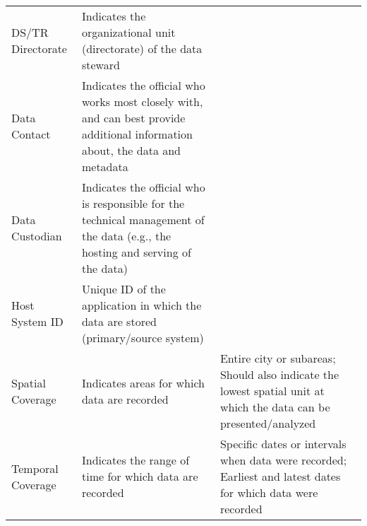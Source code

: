 \begin{table}
\begin{tabular}[t]{lll}
DS/TR Directorate & Indicates the organizational unit (directorate) of the data steward & \\
Data Contact & Indicates the official who works most closely with, and can best provide additional information about, the data and metadata & \\
Data Custodian & Indicates the official who is responsible for the technical management of the data (e.g., the hosting and serving of the data) & \\
Host System ID & Unique ID of the application in which the data are stored (primary/source system) & \\
\addlinespace
Spatial Coverage & Indicates areas for which data are recorded & Entire city or subareas; Should also indicate the lowest spatial unit at which the data can be presented/analyzed\\
Temporal Coverage & Indicates the range of time for which data are recorded & Specific dates or intervals when data were recorded; Earliest and latest dates for which data were recorded\\
\bottomrule
\end{tabular}
\end{table}